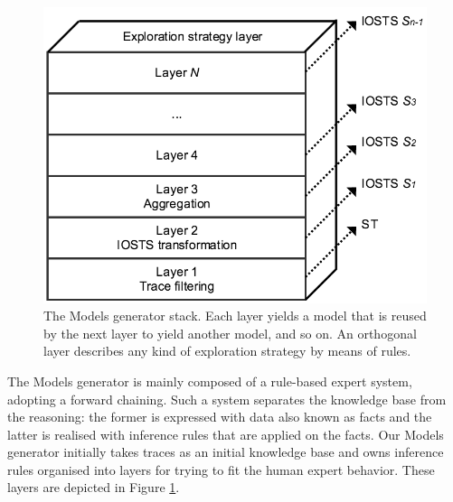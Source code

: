 \begin{figure}[ht]
    \begin{center}
        \includegraphics[width=1.0\linewidth]{figures/soict_se.png}
    \end{center}

    \caption {The Models generator stack. Each layer yields a
    model that is reused by the next layer to yield another
    model, and so on. An orthogonal layer describes any kind of
    exploration strategy by means of rules.}
    \label{fig:se}
\end{figure}

The Models generator is mainly composed of a rule-based expert
system, adopting a forward chaining. Such a system separates the
knowledge base from the reasoning: the former is expressed with
data also known as facts and the latter is realised with
inference rules that are applied on the facts. Our Models
generator initially takes traces as an initial knowledge base and
owns inference rules organised into layers for trying to fit the
human expert behavior. These layers are depicted in Figure
\ref{fig:se}.

